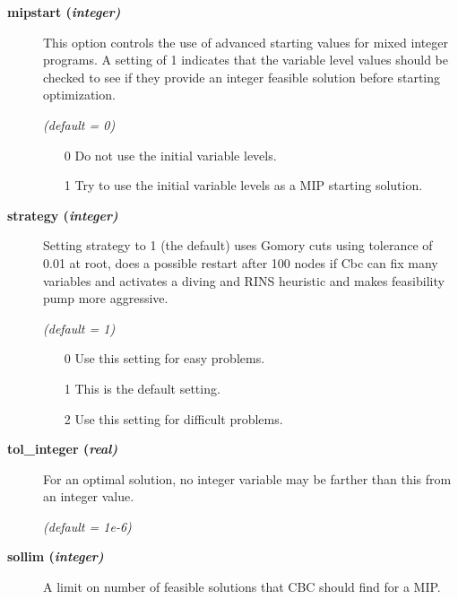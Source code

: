 \begin{description}

\item[\label{mipstart}\hypertarget{mipstart}
{\textbf{mipstart (\slshape{integer})}}]\hspace{1.0in}

This option controls the use of advanced starting values for mixed integer programs.
A setting of 1 indicates that the variable level values should be checked to see if they provide an integer feasible solution before starting optimization.

\textsl{(default = 0)}
\begin{itemize}
\item[0] 
Do not use the initial variable levels.
\item[1] 
Try to use the initial variable levels as a MIP starting solution.
\end{itemize}

\item[\label{strategy}\hypertarget{strategy}
{\textbf{strategy (\slshape{integer})}}]\hspace{1.0in}

Setting strategy to 1 (the default) uses Gomory cuts using tolerance of 0.01 at root,
does a possible restart after 100 nodes if Cbc can fix many variables and activates
a diving and RINS heuristic and makes feasibility pump more aggressive.

\textsl{(default = 1)}
\begin{itemize}
\item[0] 
Use this setting for easy problems.
\item[1] 
This is the default setting.
\item[2]
Use this setting for difficult problems.
\end{itemize}

\item[\label{tol_integer}\hypertarget{tol_integer}
{\textbf{tol\_integer (\slshape{real})}}]\hspace{1.0in}

For an optimal solution, no integer variable may be farther than this from an integer value.

\textsl{(default = 1e-6)}

\item[\label{sollim}\hypertarget{sollim}
{\textbf{sollim (\slshape{integer})}}]\hspace{1.0in}

A limit on number of feasible solutions that CBC should find for a MIP.


\end{description}
